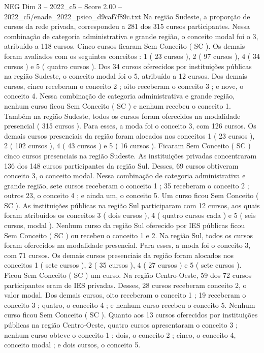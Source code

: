 \begin{textsample}{NEG Dim 3 – 2022\_c5 – Score 2.00 – 2022\_c5/enade\_2022\_psico\_d9caf7f89c.txt}
Na região Sudeste, a proporção de cursos da rede privada, correspondeu a 281 dos 315 cursos participantes.
Nessa combinação de categoria administrativa e grande região, o conceito modal foi o 3, atribuído a 118 cursos.
Cinco cursos ficaram Sem Conceito ( SC ).
Os demais foram avaliados com os seguintes conceitos : 1 ( 23 cursos ), 2 ( 97 cursos ), 4 ( 34 cursos ) e 5 ( quatro cursos ).
Dos 34 cursos oferecidos por instituições públicas na região Sudeste, o conceito modal foi o 5, atribuído a 12 cursos.
Dos demais cursos, cinco receberam o conceito 2 ; oito receberam o conceito 3 ; e nove, o conceito 4.
Nessa combinação de categoria administrativa e grande região, nenhum curso ficou Sem Conceito ( SC ) e nenhum recebeu o conceito 1.
Também na região Sudeste, todos os cursos foram oferecidos na modalidade presencial ( 315 cursos ).
Para esses, a moda foi o conceito 3, com 126 cursos.
Os demais cursos presenciais da região foram alocados nos conceitos 1 ( 23 cursos ), 2 ( 102 cursos ), 4 ( 43 cursos ) e 5 ( 16 cursos ).
Ficaram Sem Conceito ( SC ) cinco cursos presenciais na região Sudeste.
As instituições privadas concentraram 136 dos 148 cursos participantes da região Sul.
Desses, 69 cursos obtiveram conceito 3, o conceito modal.
Nessa combinação de categoria administrativa e grande região, sete cursos receberam o conceito 1 ; 35 receberam o conceito 2 ; outros 23, o conceito 4 ; e ainda um, o conceito 5.
Um curso ficou Sem Conceito ( SC ).
As instituições públicas na região Sul participaram com 12 cursos, aos quais foram atribuídos os conceitos 3 ( dois cursos ), 4 ( quatro cursos cada ) e 5 ( seis cursos, modal ).
Nenhum curso da região Sul oferecido por IES públicas ficou Sem Conceito ( SC ) ou recebeu o conceito 1 e 2.
Na região Sul, todos os cursos foram oferecidos na modalidade presencial.
Para esses, a moda foi o conceito 3, com 71 cursos.
Os demais cursos presenciais da região foram alocados nos conceitos 1 ( sete cursos ), 2 ( 35 cursos ), 4 ( 27 cursos ) e 5 ( sete cursos ).
Ficou Sem Conceito ( SC ) um curso.
Na região Centro-Oeste, 59 dos 72 cursos participantes eram de IES privadas.
Desses, 28 cursos receberam conceito 2, o valor modal.
Dos demais cursos, oito receberam o conceito 1 ; 19 receberam o conceito 3 ; quatro, o conceito 4 ; e nenhum curso recebeu o conceito 5.
Nenhum curso ficou Sem Conceito ( SC ).
Quanto aos 13 cursos oferecidos por instituições públicas na região Centro-Oeste, quatro cursos apresentaram o conceito 3 ; nenhum curso obteve o conceito 1 ; dois, o conceito 2 ; cinco, o conceito 4, conceito modal ; e dois cursos, o conceito 5.

\end{textsample}
